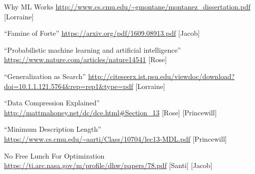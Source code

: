 \documentclass[12pt]{article}
\begin{document}
Why ML Works
\url{http://www.cs.cmu.edu/~gmontane/montanez_dissertation.pdf} [Lorraine]

“Famine of Forte”
\url{https://arxiv.org/pdf/1609.08913.pdf} [Jacob]

“Probabilistic machine learning and artificial intelligence”
\url{https://www.nature.com/articles/nature14541} [Rose]

“Generalization as Search”
\url{http://citeseerx.ist.psu.edu/viewdoc/download?doi=10.1.1.121.5764&rep=rep1&type=pdf} [Lorraine]

“Data Compression Explained” 
\url{http://mattmahoney.net/dc/dce.html#Section_13} [Rose] [Princewill]

“Minimum Description Length” 
\url{https://www.cs.cmu.edu/~aarti/Class/10704/lec13-MDL.pdf} [Princewill]

No Free Lunch For Optimization
\url{https://ti.arc.nasa.gov/m/profile/dhw/papers/78.pdf} [Santi] [Jacob]	
\end{document}
